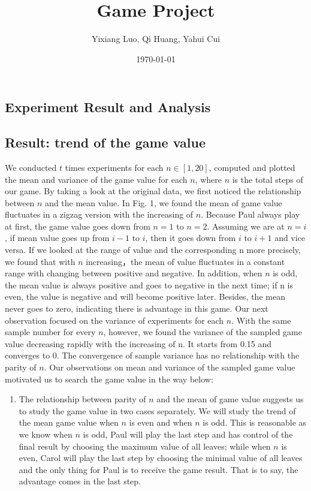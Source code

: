 \documentclass{article}
\title{ Game Project }
\author{Yixiang Luo, Qi Huang, Yahui Cui }
\date{\today}
\begin{document}
\maketitle

\begin{spacing}{1.4}

\section{Experiment Result and Analysis}
\subsection{Result: trend of the game value}
We conducted $t$ times experiments for each $n \in [1,20]$, computed and plotted the mean and variance of the game value for each $n$, where $n$ is the total steps of our game. \newline
By taking a look at the original data, we first noticed the relationship between $n$ and the mean value. In Fig. 1, we found the mean of game value fluctuates in a zigzag version with the increasing of $n$. Because Paul always play at first, the game value goes down from $n=1$ to $n=2$. Assuming we are at $n=i$, if mean value goes up from $i-1$ to $i$, then it goes down from $i$ to $i+1$ and vice versa. If we looked at the range of value and the corresponding n more precisely, we found that with $n$ increasing，the mean of value fluctuates in a constant range with changing between positive and negative. In addition, when $n$ is odd, the mean value is always positive and goes to negative in the next time; if n is even, the value is negative and will become positive later. Besides, the mean never goes to zero, indicating there is advantage in this game.\newline
Our next observation focused on the variance of experiments for each $n$. With the same sample number for every $n$, however, we found the variance of the sampled game value decreasing rapidly with the increasing of n. It starts from 0.15 and converges to 0. The convergence of sample variance has no relationship with the parity of $n$.\newline
Our observations on mean and variance of the sampled game value motivated us to search the game value in the way below:\newline
\begin{enumerate}
    \item The relationship between parity of $n$ and the mean of game value suggests us to study the game value in two cases separately. We will study the trend of the mean game value when $n$ is even and when $n$ is odd. This is reasonable as we know when $n$ is odd, Paul will play the last step and has control of the final result by choosing the maximum value of all leaves; while when $n$ is even, Carol will play the last step by choosing the minimal value of all leaves and the only thing for Paul is to receive the game result. That is to say, the advantage comes in the last step.

\end{enumerate}
\end{spacing}
\end{document}
